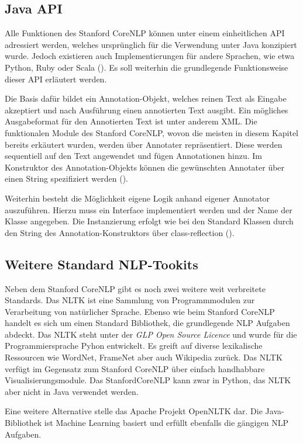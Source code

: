 \subsection{Java API}
\label{subsec:corenlpjava}
Alle Funktionen des Stanford CoreNLP können unter einem einheitlichen \ac{API} adressiert werden, welches ursprünglich für die Verwendung unter Java konzipiert wurde. Jedoch existieren auch Implementierungen für andere Sprachen, wie etwa Python, Ruby oder Scala (\cite[vgl.][3]{STANFORDNLP}). Es soll weiterhin die grundlegende Funktionsweise dieser \ac{API} erläutert werden.\par
Die Basis dafür bildet ein Annotation-Objekt, welches reinen Text als Eingabe akzeptiert und nach Ausführung einen annotierten Text ausgibt. Ein mögliches Ausgabeformat für den Annotierten Text ist unter anderem XML. Die funktionalen Module des Stanford CoreNLP, wovon die meisten in diesem Kapitel bereits erkäutert wurden, werden über Annotater repräsentiert. Diese werden sequentiell auf den Text angewendet und fügen Annotationen hinzu. Im Konstruktor des Annotation-Objekts können die gewünschten Annotater über einen String spezifiziert werden (\cite[vgl.][1]{STANFORDNLP}).\par
Weiterhin besteht die Möglichkeit eigene Logik anhand eigener Annotator auszuführen. Hierzu muss ein Interface implementiert werden und der Name der Klasse angegeben. Die Instanzierung erfolgt wie bei den Standard Klassen durch den String des Annotation-Konstruktors über class-reflection (\cite[vgl.][4]{STANFORDNLP}).

\subsection{Weitere Standard NLP-Tookits}

Neben dem Stanford CoreNLP gibt es noch zwei weitere weit verbreitete Standards. Das \ac{NLTK} ist eine Sammlung von Programmmodulen zur Verarbeitung von natürlicher Sprache. Ebenso wie beim Stanford CoreNLP handelt es sich um einen Standard Bibliothek, die grundlegende \ac{NLP} Aufgaben abdeckt. Das \ac{NLTK} steht unter der \textit{GLP Open Source Licence} und wurde für die Programmiersprache Pyhon entwickelt. Es greift auf diverse lexikalische Ressourcen wie WordNet, FrameNet aber auch Wikipedia zurück. Das \ac{NLTK} verfügt im Gegensatz zum Stanford CoreNLP über einfach handhabbare Visualisierungsmodule. Das StanfordCoreNLP kann zwar in Python, das NLTK aber nicht in Java verwendet werden.
\par
Eine weitere Alternative stelle das Apache Projekt OpenNLTK dar. Die Java-Bibliothek ist Machine Learning basiert und erfüllt ebenfalls die gängigen NLP Aufgaben.

